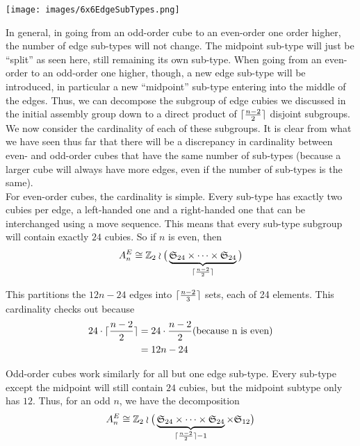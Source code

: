 \documentclass[10pt,letterpaper]{report}
\DeclarePairedDelimiter\ceil{\lceil}{\rceil}
\begin{document}
\begin{center}
\texttt{[image: images/6x6EdgeSubTypes.png]} 
\end{center}

In general, in going from an odd-order cube to an even-order one order higher, the number of edge sub-types will not change.  The midpoint sub-type will just be ``split'' as seen here, still remaining its own sub-type.  When going from an even-order to an odd-order one higher, though, a new edge sub-type will be introduced, in particular a new ``midpoint'' sub-type entering into the middle of the edges.  Thus, we can decompose the subgroup of edge cubies we discussed in the initial assembly group down to a direct product of $\ceil{\frac{n-2}{2}}$ disjoint subgroups.\\

We now consider the cardinality of each of these subgroups.  It is clear from what we have seen thus far that there will be a discrepancy in cardinality between even- and odd-order cubes that have the same number of sub-types (because a larger cube will always have more edges, even if the number of sub-types is the same).  \\

For even-order cubes, the cardinality is simple.  Every sub-type has exactly two cubies per edge, a left-handed one and a right-handed one that can be interchanged using a move sequence.  This means that every sub-type subgroup will contain exactly $24$ cubies.  So if $n$ is even, then \begin{align*}
A_n^E \cong \mathbb{Z}_2 \wr \big( \underbrace{\mathfrak{S}_{24} \times \cdots \times \mathfrak{S}_{24}}_{\ceil{\frac{n-2}{2}}} \big)
\end{align*}

This partitions the $12n - 24$ edges into $\ceil{\frac{n-2}{3}}$ sets, each of 24 elements.  This cardinality checks out because \begin{align*}
24 \cdot \ceil{\frac{n-2}{2}}
&= 24 \cdot \frac{n-2}{2} \text{(because n is even)} \\
&= 12n - 24
\end{align*}

Odd-order cubes work similarly for all but one edge sub-type.  Every sub-type except the midpoint will still contain $24$ cubies, but the midpoint subtype only has $12$.  Thus, for an odd $n$, we have the decomposition \begin{align*}
A_n^E \cong 
\mathbb{Z}_2 \wr 
\big( \underbrace{\mathfrak{S}_{24} \times \cdots \times \mathfrak{S}_{24}}_{\ceil{\frac{n-2}{2}} - 1} \times \mathfrak{S}_{12} \big)
\end{align*}
\end{document}
